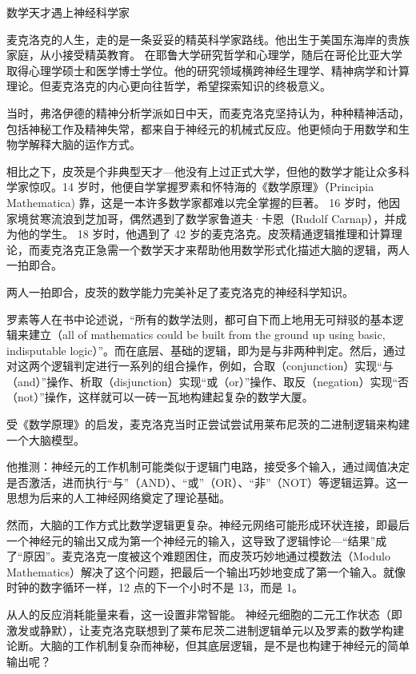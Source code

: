 \begin{story}{数学天才遇上神经科学家}

麦克洛克的人生，走的是一条妥妥的精英科学家路线。他出生于美国东海岸的贵族家庭，从小接受精英教育。
在耶鲁大学研究哲学和心理学，随后在哥伦比亚大学取得心理学硕士和医学博士学位。他的研究领域横跨神经生理学、精神病学和计算理论。但麦克洛克的内心更向往哲学，希望探索知识的终极意义。%

当时，弗洛伊德的精神分析学派如日中天，而麦克洛克坚持认为，种种精神活动，包括神秘工作及精神失常，都来自于神经元的机械式反应。他更倾向于用数学和生物学解释大脑的运作方式。

相比之下，皮茨是个非典型天才---他没有上过正式大学，但他的数学才能让众多科学家惊叹。14 岁时，他便自学掌握罗素和怀特海的《数学原理》（Principia Mathematica) 靠，这是一本许多数学家都难以完全掌握的巨著。
16 岁时，他因家境贫寒流浪到芝加哥，偶然遇到了数学家鲁道夫·卡恩（Rudolf Carnap），并成为他的学生。
18 岁时，他遇到了 42 岁的麦克洛克。皮茨精通逻辑推理和计算理论，而麦克洛克正急需一个数学天才来帮助他用数学形式化描述大脑的逻辑，两人一拍即合。

两人一拍即合，皮茨的数学能力完美补足了麦克洛克的神经科学知识。

罗素等人在书中论述说，“所有的数学法则，都可自下而上地用无可辩驳的基本逻辑来建立（all of mathematics could be built from the ground up using basic, indisputable logic）”。而在底层、基础的逻辑，即为是与非两种判定。然后，通过对这两个逻辑判定进行一系列的组合操作，例如，合取（conjunction）实现“与（and）”操作、析取（disjunction）实现“或（or）”操作、取反（negation）实现“否（not）”操作，这样就可以一砖一瓦地构建起复杂的数学大厦。

受《数学原理》的启发，麦克洛克当时正尝试尝试用莱布尼茨的二进制逻辑来构建一个大脑模型。

他推测：神经元的工作机制可能类似于逻辑门电路，接受多个输入，通过阈值决定是否激活，进而执行“与”（AND）、“或”（OR）、“非”（NOT）等逻辑运算。这一思想为后来的人工神经网络奠定了理论基础。  

然而，大脑的工作方式比数学逻辑更复杂。神经元网络可能形成环状连接，即最后一个神经元的输出又成为第一个神经元的输入，这导致了逻辑悖论---“结果”成了“原因”。麦克洛克一度被这个难题困住，而皮茨巧妙地通过模数法（Modulo Mathematics）解决了这个问题，把最后一个输出巧妙地变成了第一个输入。就像时钟的数字循环一样，12 点的下一个小时不是 13，而是 1。  

从人的反应消耗能量来看，这一设置非常智能。 
神经元细胞的二元工作状态（即激发或静默），让麦克洛克联想到了莱布尼茨二进制逻辑单元以及罗素的数学构建论断。大脑的工作机制复杂而神秘，但其底层逻辑，是不是也构建于神经元的简单输出呢？


\end{story}

